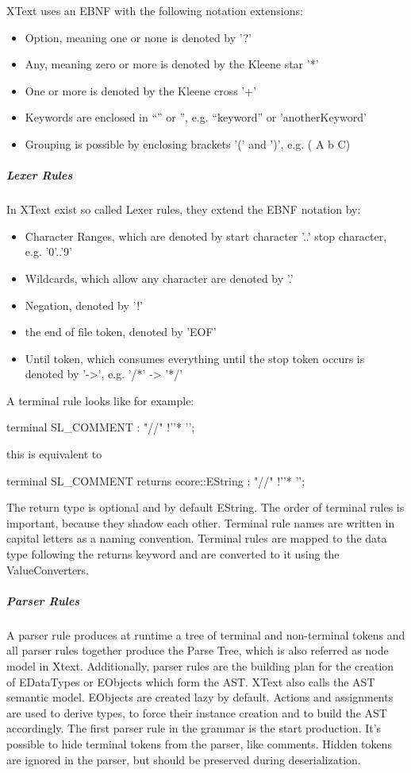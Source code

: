 XText uses an EBNF with the following notation extensions:
\begin{itemize}
	\item Option, meaning one or none is denoted by '?'
	\item Any, meaning zero or more is denoted by the Kleene star '*'
	\item One or more is denoted by the Kleene cross '+'
	\item Keywords are enclosed in ``'' or '', e.g. ``keyword'' or 'anotherKeyword'
	\item Grouping is possible by enclosing brackets '(' and  ')', e.g.  ( A b C)
\end{itemize}

\subparagraph{Lexer Rules}
In XText exist so called Lexer rules,  they extend the EBNF notation by:
\begin{itemize}
	\item Character Ranges, which are denoted by start character '..' stop character, e.g. '0'..'9' 
	\item Wildcards, which allow any character are denoted by '.'
	\item Negation, denoted by '!'
	\item the end of file token, denoted by 'EOF'
	\item Until token, which consumes everything until the stop token occurs is denoted by '->', e.g. '/*' -> '*/'
\end{itemize}
A terminal rule looks like for example:
\begin{xtxt}
terminal SL_COMMENT : "//" !'\n'* '\n';
\end{xtxt}
this is equivalent to 
\begin{xtxt}
terminal SL_COMMENT returns ecore::EString : "//" !'\n'* '\n';
\end{xtxt}
The return type is optional and by default EString. The order of terminal rules is important, because they shadow each other. Terminal rule names are written in capital letters as a naming convention. Terminal rules are mapped to the data type following the returns keyword and are converted to it using the ValueConverters.

\subparagraph{Parser Rules}
A parser rule produces at runtime a tree of terminal and non-terminal tokens and all parser rules together produce the Parse Tree, which is also referred as node model in Xtext. Additionally, parser rules are the building plan for the creation of EDataTypes or EObjects which form the AST. XText also calls the AST semantic model. EObjects are created lazy by default. Actions and assignments are used to derive types, to force their instance creation and to build the AST accordingly. The first parser rule in the grammar is the start production. It's possible to hide terminal tokens from the parser, like comments. Hidden tokens are ignored in the parser, but should be preserved during deserialization.

